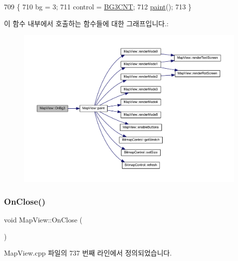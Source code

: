 \begin{DoxyCode}
709 \{
710   bg = 3;
711   control = \mbox{\hyperlink{_globals_8cpp_ad80ca049358c18c094d43407ad2f9573}{BG3CNT}};
712   \mbox{\hyperlink{class_map_view_a89edf3053cffa4a68516178dbd987339}{paint}}();
713 \}
\end{DoxyCode}
이 함수 내부에서 호출하는 함수들에 대한 그래프입니다.\+:
\nopagebreak
\begin{figure}[H]
\begin{center}
\leavevmode
\includegraphics[width=350pt]{class_map_view_a1d3dab96b11cbe494f45f4d1bc86331f_cgraph}
\end{center}
\end{figure}
\mbox{\label{class_map_view_a4831981d7411a8a37353679421517cf8}} 
\subsubsection{\texorpdfstring{On\+Close()}{OnClose()}}
{\footnotesize\ttfamily void Map\+View\+::\+On\+Close (\begin{DoxyParamCaption}{ }\end{DoxyParamCaption})\hspace{0.3cm}{\ttfamily [protected]}}



Map\+View.\+cpp 파일의 737 번째 라인에서 정의되었습니다.


